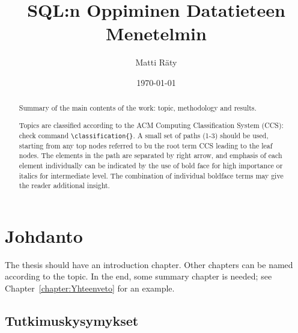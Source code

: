 \documentclass[finnish,twoside,openright]{HYgraduMLDS}
\title{SQL:n Oppiminen Datatieteen Menetelmin}
\author{Matti Räty}
\date{\today}
\begin{document}
\maketitle


\begin{abstract}
Summary of the main contents of the work: topic, methodology and results.

Topics are classified according to the ACM Computing Classification System
(CCS): check command \verb+\classification{}+. A small set of paths (1-3) should be used, starting from any top nodes
referred to bu the root term CCS leading to the leaf nodes. The elements
in the path are separated by right arrow, and emphasis of each element individually can be indicated
by the use of bold face for high importance or italics for intermediate
level. The combination of individual boldface terms may give the reader
additional insight. 
\end{abstract}

\mytableofcontents

\mynomenclature

\chapter{Johdanto}

The thesis should have an introduction chapter. Other chapters can be named according to the topic. In the end, some summary chapter is needed; see Chapter~\ref{chapter:Yhteenveto} for an example.

\section{Tutkimuskysymykset}
\end{document}
